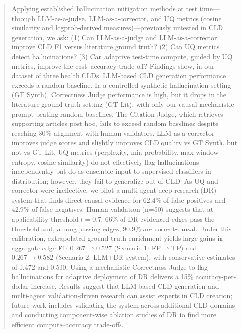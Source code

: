 \begin{abstract}
Applying established hallucination mitigation methods at test time---through LLM-as-a-judge, LLM-as-a-corrector, and UQ metrics (cosine similarity and logprob-derived measures)---previously untested in CLD generation, we ask: (1) Can LLM-as-a-judge and LLM-as-a-corrector improve CLD F1 versus literature ground truth? (2) Can UQ metrics detect hallucinations? (3) Can adaptive test-time compute, guided by UQ metrics, improve the cost--accuracy trade-off?
Findings show, in our dataset of three health CLDs, LLM-based CLD generation performance exceeds a random baseline. In a controlled synthetic hallucination setting (GT Synth), Correctness Judge performance is high, but it drops in the literature ground-truth setting (GT Lit), with only our causal mechanistic prompt beating random baselines. The Citation Judge, which retrieves supporting articles post hoc, fails to exceed random baselines despite reaching 80\% alignment with human validators. LLM-as-a-corrector improves judge scores and slightly improves CLD quality vs GT Synth, but not vs GT Lit.  
UQ metrics (perplexity, min probability, max window entropy, cosine similarity) do not effectively flag hallucinations independently but do as ensemble input to supervised classifiers in-distribution; however, they fail to generalize out-of-CLD. As UQ and corrector were ineffective, we pilot a multi-agent deep research (DR) system that finds direct causal evidence for 62.4\% of false positives and 42.9\% of false negatives. Human validation (n=50) suggests that at applicability threshold $t=0.7$, 66\% of DR-evidenced edges pass the threshold and, among passing edges, 90.9\% are correct-causal. Under this calibration, extrapolated ground-truth enrichment yields large gains in aggregate edge F1: $0.267 \to 0.527$ (Scenario 1: FP$\to$TP) and $0.267 \to 0.582$ (Scenario 2: LLM+DR system), with conservative estimates of 0.472 and 0.500. Using a mechanistic Correctness Judge to flag hallucinations for adaptive deployment of DR delivers a 15\% accuracy-per-dollar increase. Results suggest that LLM-based CLD generation and multi-agent validation-driven research can assist experts in CLD creation; future work includes validating the system across additional CLD domains and conducting component-wise ablation studies of DR to find more efficient compute–accuracy trade-offs.


\end{abstract}
